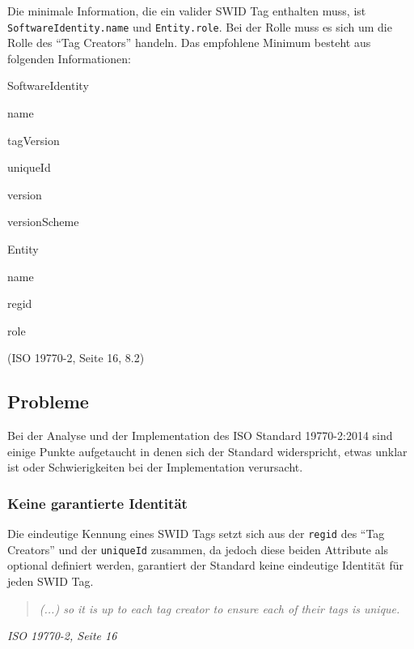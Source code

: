 \begin{itemize}
	\item Die minimale Information, die ein valider SWID Tag enthalten muss, ist
	\texttt{SoftwareIdentity.name} und \texttt{Entity.role}. Bei der Rolle muss es
	sich um die Rolle des \enquote{Tag Creators} handeln. Das empfohlene
	Minimum besteht aus folgenden Informationen:
		\item Entity
	\end{itemize*}	
	(ISO 19770-2\cite{iso19770-2}, Seite 16, 8.2)
	
\end{itemize}


\subsection{Probleme}
Bei der Analyse und der Implementation des ISO Standard 19770-2:2014 sind
einige Punkte aufgetaucht in denen sich der Standard widerspricht, etwas unklar
ist oder Schwierigkeiten bei der Implementation verursacht.

\subsubsection{Keine garantierte Identität}
Die eindeutige Kennung eines SWID Tags setzt sich aus der \texttt{regid} des
\enquote{Tag Creators} und der \texttt{uniqueId} zusammen, da jedoch diese
beiden Attribute als optional definiert werden, garantiert der Standard keine
eindeutige Identität für jeden SWID Tag.
\begin{quote}
\textit{(...) so it is up to each tag creator to ensure each of their tags is
unique.}
\end{quote}
\textit{ISO 19770-2\cite{iso19770-2}, Seite 16}\\

